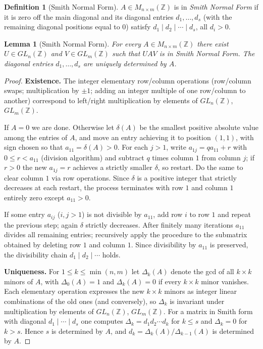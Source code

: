 \documentclass{article}
\newtheorem{lemma}[theorem]{Lemma}
\theoremstyle{definition}
\newtheorem{definition}[theorem]{Definition}
\begin{document}
\begin{definition}[Smith Normal Form]
$A\in M_{n\times m}(\mathbb{Z})$ is in \emph{Smith Normal Form} if it is
zero off the main diagonal and its diagonal entries
$d_1,\dots,d_s$ (with the remaining diagonal positions equal to $0$)
satisfy $d_1\mid d_2\mid\cdots\mid d_s$, all $d_i>0$.
\end{definition}

\begin{lemma}[Smith Normal Form]\label{lem:snf}
For every $A\in M_{n\times m}(\mathbb{Z})$ there exist $U\in GL_n(\mathbb{Z})$
and $V\in GL_m(\mathbb{Z})$ such that $UAV$ is in Smith Normal Form. The
diagonal entries $d_1,\dots,d_s$ are uniquely determined by $A$.
\end{lemma}

\begin{proof}
\textbf{Existence.} The integer elementary row/column operations
(row/column swaps; multiplication by $\pm 1$; adding an integer
multiple of one row/column to another) correspond to left/right
multiplication by elements of $GL_n(\mathbb{Z})$, $GL_m(\mathbb{Z})$.

If $A=0$ we are done. Otherwise let $\delta(A)$ be the smallest
positive absolute value among the entries of $A$, and move an entry
achieving it to position $(1,1)$, with sign chosen so that
$a_{11}=\delta(A)>0$. For each $j>1$, write $a_{1j}=qa_{11}+r$ with
$0\le r<a_{11}$ (division algorithm) and subtract $q$ times column $1$
from column $j$; if $r>0$ the new $a_{1j}=r$ achieves a strictly
smaller $\delta$, so restart. Do the same to clear column $1$ via row
operations. Since $\delta$ is a positive integer that strictly
decreases at each restart, the process terminates with row $1$ and
column $1$ entirely zero except $a_{11}>0$.

If some entry $a_{ij}$ ($i,j>1$) is not divisible by $a_{11}$, add
row $i$ to row $1$ and repeat the previous step; again $\delta$
strictly decreases. After finitely many iterations $a_{11}$ divides
all remaining entries; recursively apply the procedure to the
submatrix obtained by deleting row $1$ and column $1$. Since
divisibility by $a_{11}$ is preserved, the divisibility chain
$d_1\mid d_2\mid\cdots$ holds.

\textbf{Uniqueness.} For $1\le k\le\min(n,m)$ let $\Delta_k(A)$
denote the gcd of all $k\times k$ minors of $A$, with
$\Delta_0(A)=1$ and $\Delta_k(A)=0$ if every $k\times k$ minor
vanishes. Each elementary operation expresses the new $k\times k$
minors as integer linear combinations of the old ones (and
conversely), so $\Delta_k$ is invariant under multiplication by
elements of $GL_n(\mathbb{Z})$, $GL_m(\mathbb{Z})$. For a matrix in Smith form
with diagonal $d_1\mid\cdots\mid d_s$ one computes
$\Delta_k=d_1d_2\cdots d_k$ for $k\le s$ and $\Delta_k=0$ for $k>s$.
Hence $s$ is determined by $A$, and
$d_k=\Delta_k(A)/\Delta_{k-1}(A)$ is determined by $A$.
\end{proof}
\end{document}
